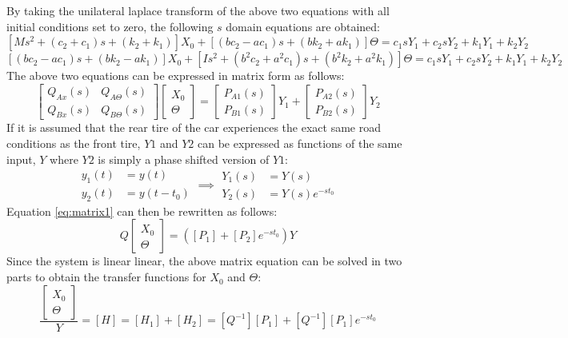 \documentclass[12pt]{article}
\begin{document}
By taking the unilateral laplace transform of the above two equations with all initial conditions set to zero, the following $s$ domain equations are obtained:
\begin{equation}
	\left[Ms^2+(c_2+c_1)s+(k_2+k_1)\right]X_0 + \left[(bc_2-ac_1)s+(bk_2+ak_1)\right]\Theta = c_1sY_1 + c_2sY_2 + k_1Y_1 + k_2Y_2
\end{equation}
\begin{equation}
	\left[(bc_2-ac_1)s+(bk_2-ak_1)\right]X_0 + \left[Is^2+ (b^2c_2+a^2c_1)s+(b^2k_2+a^2k_1)\right]\Theta = c_1sY_1 + c_2sY_2 + k_1Y_1 + k_2Y_2
\end{equation}
The above two equations can be expressed in matrix form as follows: 
\begin{equation}
	\label{eq:matrix1}
	\begin{bmatrix} 
	Q_{Ax}(s) & Q_{A\Theta}(s) \\
	Q_{Bx}(s) & Q_{B\Theta}(s)
	\end{bmatrix}
	\begin{bmatrix} 
	X_0 \\
	\Theta 
	\end{bmatrix}
	= 
	\begin{bmatrix} 
	P_{A1}(s) \\
	P_{B1}(s)
	\end{bmatrix}Y_1 +
	\begin{bmatrix} 
	P_{A2}(s) \\
	P_{B2}(s)
	\end{bmatrix}
	Y_2
\end{equation}
If it is assumed that the rear tire of the car experiences the exact same road conditions as the front tire, $Y1$ and $Y2$ can be expressed as functions of the same input, $Y$ where $Y2$ is simply a phase shifted version of $Y1$:
\begin{equation}
	\begin{split}
		y_1(t) &= y(t)\\
		y_2(t) &= y(t-t_0)
	\end{split} \implies
	\begin{split}
		Y_1(s) &= Y(s)\\
		Y_2(s) &= Y(s)e^{-st_0}
	\end{split}
\end{equation}
Equation \ref{eq:matrix1} can then be rewritten as follows:
\begin{equation}
	\label{eq:matrix1}
	Q
	\begin{bmatrix} 
	X_0 \\
	\Theta 
	\end{bmatrix}
	= 
	\left(\left[P_1\right]+\left[P_2\right]e^{-st_0}\right)Y
\end{equation}
Since the system is linear linear, the above matrix equation can be solved in two parts to obtain the transfer functions for $X_0$ and $\Theta$:
\begin{equation}
	\frac{\begin{bmatrix} 
		X_0 \\
		\Theta 
	\end{bmatrix}}{Y} =
	\left[H\right] = 
	\left[H_1\right] + \left[H_2\right] = 
	[Q^{-1}][P_1] + [Q^{-1}][P_1]e^{-st_0} 
\end{equation} 
\end{document}

